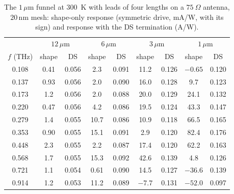 \documentclass[aps,prapplied,onecolumn,superscriptaddress,floatfix]{revtex4-2}
\newcommand{\um}{\,\mu\mathrm{m}}
\newcommand{\nm}{\,\mathrm{nm}}
\begin{document}
\begin{table}[ht]
\caption{\label{tab:leadsfreq}The $1\um$ funnel at $300$~K with leads of
four lengths on a $75\ \Omega$ antenna, $20\nm$ mesh: shape-only
response (symmetric drive, mA/W, with its sign) and response with the DS
termination (A/W).}
\begin{ruledtabular}
\begin{tabular}{ccccccccc}
 & \multicolumn{2}{c}{$12\um$} & \multicolumn{2}{c}{$6\um$} & \multicolumn{2}{c}{$3\um$} & \multicolumn{2}{c}{$1\um$} \\
$f$ (THz) & shape & DS & shape & DS & shape & DS & shape & DS \\
\hline
0.108 & 0.41 & 0.056 & 2.3 & 0.091 & 11.2 & 0.126 & $-0.65$ & 0.120 \\
0.137 & 0.93 & 0.056 & 2.0 & 0.090 & 16.0 & 0.128 & 9.7 & 0.123 \\
0.173 & 1.2 & 0.056 & 2.0 & 0.088 & 20.0 & 0.129 & 24.1 & 0.132 \\
0.220 & 0.47 & 0.056 & 4.2 & 0.086 & 19.5 & 0.124 & 43.3 & 0.147 \\
0.279 & 1.4 & 0.055 & 10.7 & 0.086 & 10.9 & 0.118 & 66.5 & 0.165 \\
0.353 & 0.90 & 0.055 & 15.1 & 0.091 & 2.9 & 0.120 & 82.4 & 0.176 \\
0.448 & 2.3 & 0.055 & 2.2 & 0.087 & 17.4 & 0.120 & 62.2 & 0.163 \\
0.568 & 1.7 & 0.055 & 15.3 & 0.092 & 42.6 & 0.139 & 4.8 & 0.126 \\
0.721 & 1.1 & 0.054 & 0.61 & 0.090 & 14.5 & 0.127 & $-36.6$ & 0.139 \\
0.914 & 1.2 & 0.053 & 11.2 & 0.089 & $-7.7$ & 0.131 & $-52.0$ & 0.097 \\
\end{tabular}
\end{ruledtabular}
\end{table}
\end{document}
